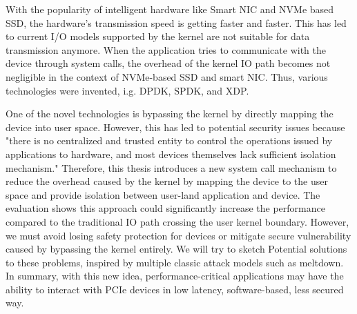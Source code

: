 




With the popularity of intelligent hardware like 
Smart NIC and NVMe based SSD, the hardware's transmission 
speed is getting faster and faster. This has led to current 
I/O models supported by the kernel are not suitable for data 
transmission anymore. When the application tries to communicate
 with the device through system calls, the overhead of the kernel IO path 
 becomes not negligible in the context of NVMe-based SSD and smart NIC. 
 Thus, various technologies were invented, i.g. DPDK, SPDK, and XDP.

One of the novel technologies is bypassing the kernel 
by directly mapping the device into user space. However, 
this has led to potential security issues because "there is 
no centralized and trusted entity to control the operations 
issued by applications to hardware, and most devices
themselves lack sufficient isolation mechanism." Therefore, 
this thesis introduces a new system call mechanism to reduce 
the overhead caused by the kernel by mapping the device to the
 user space and provide isolation between user-land application and device. 
 The evaluation shows this approach could significantly increase the performance 
 compared to the traditional IO path crossing the user kernel boundary. However, 
 we must avoid losing safety protection for devices or mitigate secure vulnerability 
 caused by bypassing the kernel entirely. We will try to
sketch Potential solutions to these problems, inspired by multiple 
classic attack models such as meltdown. In summary, with this new idea, 
performance-critical applications may have the ability to interact with 
PCIe devices in low latency, software-based, less secured way.


